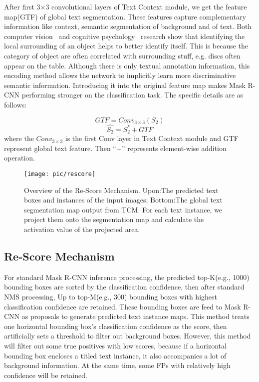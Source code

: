 \documentclass[letterpaper]{article} \usepackage{aaai19}  \usepackage{times}  \usepackage{helvet}  \usepackage{courier}  \usepackage{url}  \usepackage{graphicx}
\begin{document}
After first 3$\times$3 convolutional layers of Text Context module, we get the feature map(GTF) of global text segmentation. 
These features capture complementary information like context, semantic segmentation of background and of text.
Both computer vision~\cite{divvala2009empirical} and cognitive psychology~\cite{oliva2007role} research show that identifying the local surrounding of an object helps to better identify itself. 
This is because the category of object are often correlated with surrounding stuff, e.g. discs often appear on the table. 
Although there is only textual annotation information, this encoding method allows the network to implicitly learn more discriminative semantic information.
Introducing it into the original feature map makes Mask R-CNN performing stronger on the classification task.
The specific details are as follows:

\begin{equation}
\label{gongshi5}
GTF = Conv_{3\times3}(S_2)
\end{equation}
\begin{equation}
\label{gongshi6}
\hat{S_2} = S_2^* + GTF
\end{equation}
where the $Conv_{3\times3}$ is the first Conv layer in Text Context module and GTF represent global text feature. Then ``$+$'' represents element-wise addition operation.



\begin{figure}[htp]
\centering
\texttt{[image: pic/rescore]}
\caption{\label{rescore}{Overview of the Re-Score Mechanism. Upon:The predicted text boxes and instances of the input images; Bottom:The global text segmentation map output from TCM. For each text instance, we project them onto the segmentation map and calculate the activation value of the projected area. }}
\end{figure}



 \subsection{Re-Score Mechanism}
For standard Mask R-CNN inference processing, the predicted top-K(e.g., 1000) bounding boxes are sorted by the classification confidence, then after standard NMS processing, Up to top-M(e.g.,  300) bounding boxes with highest classification confidence are retained. These bounding boxes are feed to Mask R-CNN as proposals to generate predicted text instance maps. 
This method treats one horizontal bounding box's classification confidence as the score, then artificially sets a threshold to filter out background boxes.
However, this method will filter out some true positives with low scores, because if a horizontal bounding box encloses a titled text instance, it also accompanies a lot of background information. 
At the same time, some FPs with relatively high confidence will be retained.
\end{document}
